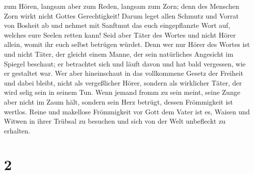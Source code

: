 zum Hören, langsam aber zum Reden, langsam zum Zorn; 
denn des Menschen Zorn wirkt nicht Gottes Gerechtigkeit! 
Darum leget allen Schmutz und Vorrat von Bosheit ab und nehmet mit
Sanftmut das euch eingepflanzte Wort auf, welches eure Seelen retten
kann!  Seid aber Täter des Wortes und nicht Hörer allein,
womit ihr euch selbst betrügen würdet.  Denn wer nur
Hörer des Wortes ist und nicht Täter, der gleicht einem Manne, der sein
natürliches Angesicht im Spiegel beschaut;  er betrachtet
sich und läuft davon und hat bald vergessen, wie er gestaltet war.
 Wer aber hineinschaut in das vollkommene Gesetz der
Freiheit und dabei bleibt, nicht als vergeßlicher Hörer, sondern als
wirklicher Täter, der wird selig sein in seinem Tun. 
Wenn jemand fromm zu sein meint, seine Zunge aber nicht im Zaum hält,
sondern sein Herz betrügt, dessen Frömmigkeit ist wertlos.
 Reine und makellose Frömmigkeit vor Gott dem Vater ist
es, Waisen und Witwen in ihrer Trübsal zu besuchen und sich von der Welt
unbefleckt zu erhalten.

\hypertarget{section-1}{%
\section{2}\label{section-1}}

